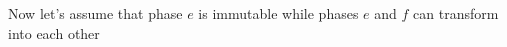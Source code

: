 Now let's assume that phase \(e\) is immutable while phases \(e\) and \(f\) can transform into each other